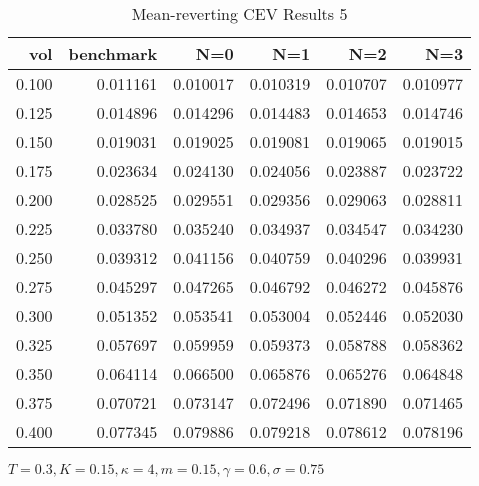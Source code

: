 \begin{table}[ht]
  \centering
  \caption{Mean-reverting CEV Results 5}
  \begin{tabular}{rrrrrr}
  \toprule
    vol &       benchmark &       N=0 &       N=1 &       N=2 &       N=3 \\
  \midrule
  0.100 & 0.011161 & 0.010017 & 0.010319 & 0.010707 & 0.010977 \\
  0.125 & 0.014896 & 0.014296 & 0.014483 & 0.014653 & 0.014746 \\
  0.150 & 0.019031 & 0.019025 & 0.019081 & 0.019065 & 0.019015 \\
  0.175 & 0.023634 & 0.024130 & 0.024056 & 0.023887 & 0.023722 \\
  0.200 & 0.028525 & 0.029551 & 0.029356 & 0.029063 & 0.028811 \\
  0.225 & 0.033780 & 0.035240 & 0.034937 & 0.034547 & 0.034230 \\
  0.250 & 0.039312 & 0.041156 & 0.040759 & 0.040296 & 0.039931 \\
  0.275 & 0.045297 & 0.047265 & 0.046792 & 0.046272 & 0.045876 \\
  0.300 & 0.051352 & 0.053541 & 0.053004 & 0.052446 & 0.052030 \\
  0.325 & 0.057697 & 0.059959 & 0.059373 & 0.058788 & 0.058362 \\
  0.350 & 0.064114 & 0.066500 & 0.065876 & 0.065276 & 0.064848 \\
  0.375 & 0.070721 & 0.073147 & 0.072496 & 0.071890 & 0.071465 \\
  0.400 & 0.077345 & 0.079886 & 0.079218 & 0.078612 & 0.078196 \\
  \bottomrule
  \end{tabular}
  \small{$T=0.3,K=0.15, \kappa = 4,m=0.15, \gamma = 0.6, \sigma = 0.75$}
\end{table}     

